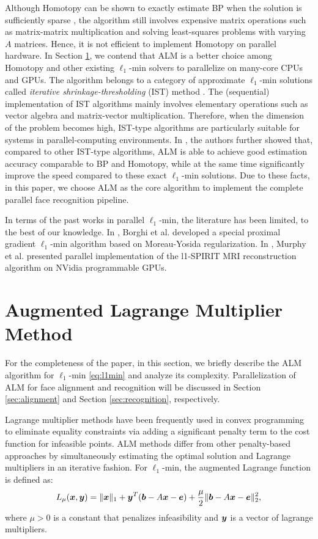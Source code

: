 \documentclass[10pt,twocolumn,letterpaper]{article}
\begin{document}
Although Homotopy can be shown to exactly estimate BP when the solution is
sufficiently sparse \cite{DonohoD2006}, the algorithm still involves expensive
matrix operations such as matrix-matrix multiplication and solving
least-squares problems with varying $A$ matrices. Hence, it is not efficient to
implement Homotopy on parallel hardware. In Section \ref{sec:ALM}, we contend
that ALM is a better choice among Homotopy and other existing $\ell_1$-min
solvers to parallelize on many-core CPUs and GPUs. The algorithm belongs to a
category of approximate $\ell_1$-min solutions called \emph{iterative
shrinkage-thresholding} (IST) method \cite{WrightS2008,BeckA2009}. The
(sequential) implementation of IST algorithms mainly involves elementary
operations such as vector algebra and matrix-vector multiplication. Therefore,
when the dimension of the problem becomes high, IST-type algorithms are
particularly suitable for systems in parallel-computing environments. In
\cite{YangA2010-ICIP}, the authors further showed that, compared to other
IST-type algorithms, ALM is able to achieve good estimation accuracy comparable
to BP and Homotopy, while at the same time significantly improve the speed
compared to these exact $\ell_1$-min solutions. Due to these facts, in this
paper, we choose ALM as the core algorithm to implement the complete parallel
face recognition pipeline.

In terms of the past works in parallel $\ell_1$-min, the literature has been
limited, to the best of our knowledge. In \cite{BorghiA2010}, Borghi et al.
developed a special proximal gradient $\ell_1$-min algorithm based on
Moreau-Yosida regularization. In \cite{MurphyM2010}, Murphy et al. presented
parallel implementation of the l1-SPIRIT MRI reconstruction algorithm on NVidia
programmable GPUs.

\section{Augmented Lagrange Multiplier Method}
\label{sec:ALM}

For the completeness of the paper, in this section, we briefly describe the ALM
algorithm for $\ell_1$-min \eqref{eq:l1min} \cite{YangA2010-ICIP} and analyze
its complexity. Parallelization of ALM for face alignment and recognition will
be discussed in Section \ref{sec:alignment} and Section \ref{sec:recognition},
respectively.

Lagrange multiplier methods have been frequently used in convex programming to
eliminate equality constraints via adding a significant penalty term to the
cost function for infeasible points. ALM methods differ from other
penalty-based approaches by simultaneously estimating the optimal solution and
Lagrange multipliers in an iterative fashion.  For $\ell_1$-min, the augmented
Lagrange function is defined as: \begin{equation} L_\mu({\boldsymbol{x}},{\boldsymbol{y}}) = \|{\boldsymbol{x}}\|_1 +
{\boldsymbol{y}}^T({\boldsymbol{b}} - A{\boldsymbol{x}} - {\boldsymbol{e}}) + \frac{\mu}{2} \| {\boldsymbol{b}}-A{\boldsymbol{x}}-{\boldsymbol{e}} \|_2^2, \end{equation}
where $\mu > 0$ is a constant that penalizes infeasibility and ${\boldsymbol{y}}$ is a
vector of lagrange multipliers.
\end{document}
